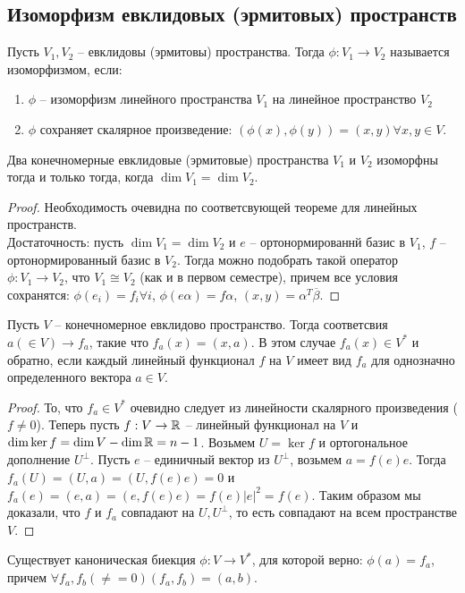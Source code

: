 \subsection{Изоморфизм евклидовых (эрмитовых) пространств}
\begin{definition}
    Пусть $V_1, V_2$ -- евклидовы (эрмитовы) пространства. Тогда $\phi: V_1 \to V_2$ называется изоморфизмом, если:
    \begin{enumerate}
        \item $\phi$ -- изоморфизм линейного пространства $V_1$ на линейное пространство $V_2$
        \item $\phi$ сохраняет скалярное произведение: $(\phi(x), \phi(y)) = (x, y) \forall x, y \in V$.
    \end{enumerate}
\end{definition}

\begin{proposition}
    Два конечномерные евклидовые (эрмитовые) пространства $V_1$ и $V_2$ изоморфны тогда и только тогда, когда $\dim V_1 = \dim V_2$.
\end{proposition}

\begin{proof}
    Необходимость очевидна по соответсвующей теореме для линейных пространств. \\
    Достаточность: пусть $\dim V_1 = \dim V_2$ и $e$ -- ортонормированнй базис в $V_1$, $f$ -- ортонормированный базис в $V_2$. Тогда можно подобрать такой оператор $\phi: V_1 \to V_2$, что $V_1 \cong V_2$ (как и в первом семестре), причем все условия сохранятся: $\phi(e_i) = f_i \forall i$, $\phi(e \alpha) = f \alpha$, $(x, y) = \alpha^T \overline{\beta}$.  
\end{proof}

\begin{theorem}[Рисс]
    Пусть $V$ -- конечномерное евклидово пространство. Тогда соответсвия $a (\in V) \to f_a$, такие что $f_a(x) = (x, a)$. В этом случае $f_a(x) \in V^*$ и обратно, если каждый линейный функционал $f$ на $V$ имеет вид $f_a$ для однозначно определенного вектора $a \in V$.
\end{theorem}

\begin{proof}
    То, что $f_a \in V^*$ очевидно следует из линейности скалярного произведения ($f \neq 0$). Теперь пусть $f: V \to \mathbb{R}$ -- линейный функционал на $V$ и $\dim \ker f = \dim V - \dim \mathbb{R} = n - 1$.
    Возьмем $U = \ker f$ и ортогональное дополнение $U^{\perp}$. Пусть $e$ -- единичный вектор из $U^{\perp}$, возьмем $a = f(e)e$. Тогда $f_a(U) = (U, a) = (U, f(e) e) = 0$ и $f_a(e) = (e, a) = (e, f(e)e) = f(e) |e|^2 = f(e)$. Таким образом мы доказали, что $f$ и $f_a$ совпадают на $U, U^{\perp}$, то есть совпадают на всем пространстве $V$.
\end{proof}
\begin{note}
    Существует каноническая биекция $\phi: V \to V^*$, для которой верно: $\phi(a) = f_a$, причем $\forall f_a, f_b (\neq = 0) (f_a, f_b) = (a, b)$.
\end{note}


